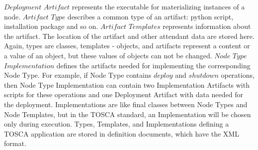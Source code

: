 $Deployment$ $Artifact$ represents the executable for materializing instances of a node.
$Artifact$ $Type$ describes a common type of an artifact: python script, installation package and so on.
$Artifact$ $Templates$ represents information about the artifact. 
The location of the artifact and other attendant data are stored here. 
Again, types are classes, templates - objects, and artifacts represent a content or a value of an object, but these values of objects can not be changed. %
$Node$ $Type$ $Implementation$ defines the artifacts needed for implementing the corresponding Node Type.
For example, if Node Type contains $deploy$ and $shutdown$ operations, then Node Type Implementation can contain two Implementation Artifacts with scripts for these operations and one Deployment Artifact with data needed for the deployment. %
Implementations are like final classes between Node Types and Node Templates, but in the TOSCA standard, an Implementation will be chosen only during execution.
Types, Templates, and Implementations defining a TOSCA application are stored in definition documents, which have the XML format. %
